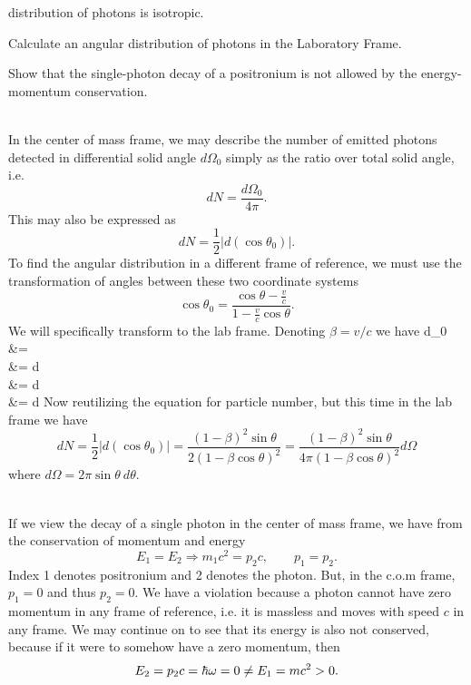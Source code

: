 \documentclass[10pt,letterpaper]{article}
\begin{document}
distribution of photons is isotropic.
\benum
\item
Calculate an angular distribution of photons in the Laboratory Frame.
\item
Show that the single-photon decay of a positronium is not allowed by the energy-momentum conservation. 
\\ \\
\eenum
\benum
\item
In the center of mass frame, we may describe the number of emitted photons detected 
in differential solid angle $d\Omega_0$ simply as the ratio over total solid angle, i.e.
\[
	dN = \frac{d\Omega_0}{4\pi}.
\]
This may also be expressed as 
\[
	dN = \frac{1}{2} |d(\cos\theta_0)|.
\]
To find the angular distribution in a different frame of reference, we must use the transformation of angles between these two coordinate systems
\[
	\cos\theta_0 = \frac{\cos\theta -\frac{v}{c}}{1-\frac{v}{c}\cos\theta}.
\]
We will specifically transform to the lab frame. Denoting $\beta = v/c$ we have
\ba
	d\cos\theta_0 &= \diff{\theta}\\
	&= \diff{\theta}d\theta\\
	&= d\theta\\
	&= d\theta
\ea
Now reutilizing the equation for particle number, but this time in the lab frame we have
\[
	dN = \frac{1}{2}|d(\cos\theta_0)|  = \frac{(1-\beta)^2\sin\theta}{2(1-\beta\cos\theta)^2} = 
	\frac{(1-\beta)^2\sin\theta}{4\pi(1-\beta\cos\theta)^2}d\Omega
\]
where $d\Omega = 2\pi \sin\theta\ d\theta$. 
\\ \\
\item
If we view the decay of a single photon in the center of mass frame, we have from the conservation of momentum
and energy
\[
	E_1=E_2\Rightarrow m_1c^2 = p_2c,\qquad p_1 = p_2.
\]
Index 1 denotes positronium and 2 denotes the photon.
But, in the c.o.m frame, $p_1 = 0$ and thus $p_2 = 0$. We have a violation because a photon cannot
have zero momentum in any frame of reference, i.e. it is massless and moves with speed $c$ in any frame.
We may continue on to see that its energy is also not conserved, because if it were to somehow have a zero momentum, then
\[
	E_2 = p_2c = \hbar\omega =0\ne E_1 = mc^2 >0.
\]
\end{document}
